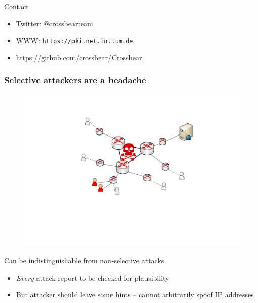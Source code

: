 \begin{frame}
\begin{center}
  \end{center}
  \begin{block}{Contact}
    \begin{itemize}
    \item Twitter: @crossbearteam
    \item WWW: \texttt{https://pki.net.in.tum.de}
    \item \url{https://github.com/crossbear/Crossbear}
    \end{itemize}
  \end{block}
\end{frame}



\begin{frame}
  \frametitle{Selective attackers are a headache}
  \begin{figure}[t]
    \centering
    \includegraphics[scale=.3]{figures/scenario4-core-selective.pdf}
  \end{figure}
  \begin{block}{Can be indistinguishable from non-selective attacks}
    \begin{itemize}
    \item \textit{Every} attack report to be checked for plausibility
    \item But attacker should leave some hints -- cannot arbitrarily spoof IP addresses
    \end{itemize}
  \end{block}
\end{frame}



